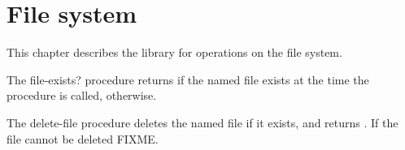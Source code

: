 \chapter{File system}
\label{sortingchapter}

This chapter describes the  library for
operations on the file system.

\begin{entry}{%
}

  The {\cf file-exists?} procedure
returns \schtrue{} if the named file exists at the time the procedure
is called, \schfalse{} otherwise.
\end{entry}

\begin{entry}{%
}

  The {\cf delete-file} procedure
deletes the named file if it exists, and returns \unspecifiedreturn.
If the file cannot be deleted FIXME.
\end{entry}


